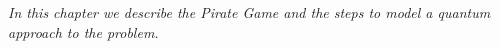 
\label{cap:chapter4}

\textit{In this chapter we describe the Pirate Game and the steps to model a quantum approach to the problem. }


%
\cleardoublepage